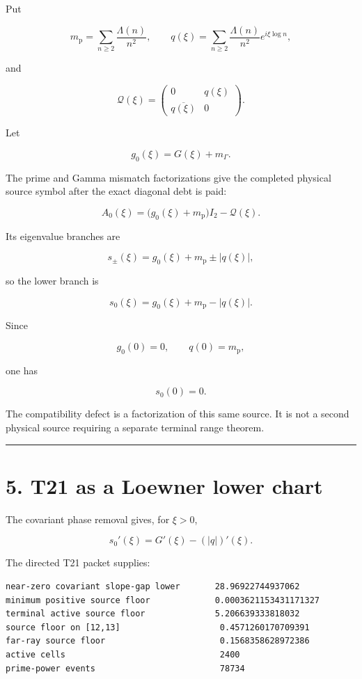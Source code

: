 Put

\[
m_{\mathrm p}
=
\sum_{n\ge2}\frac{\Lambda(n)}{n^2},
\qquad
q(\xi)
=
\sum_{n\ge2}
\frac{\Lambda(n)}{n^2}e^{i\xi\log n},
\]

and

\[
\mathcal Q(\xi)
=
\begin{pmatrix}
0&q(\xi)\\
\overline{q(\xi)}&0
\end{pmatrix}.
\]

Let

\[
g_0(\xi)=G(\xi)+m_\Gamma.
\]

The prime and Gamma mismatch factorizations give the completed physical source
symbol after the exact diagonal debt is paid:

\[
\boxed{
A_0(\xi)
=
\bigl(g_0(\xi)+m_{\mathrm p}\bigr)I_2
-
\mathcal Q(\xi).
}
\tag{4.1}
\]

Its eigenvalue branches are

\[
s_\pm(\xi)
=
g_0(\xi)+m_{\mathrm p}\pm|q(\xi)|,
\]

so the lower branch is

\[
\boxed{
s_0(\xi)
=
g_0(\xi)+m_{\mathrm p}-|q(\xi)|.
}
\tag{4.2}
\]

Since

\[
g_0(0)=0,
\qquad
q(0)=m_{\mathrm p},
\]

one has

\[
s_0(0)=0.
\]

The compatibility defect is a factorization of this same source. It is not a
second physical source requiring a separate terminal range theorem.

\begin{center}\rule{0.5\linewidth}{0.5pt}\end{center}

\hypertarget{t21-as-a-loewner-lower-chart}{%
\section{5. T21 as a Loewner lower chart}\label{t21-as-a-loewner-lower-chart}}

The covariant phase removal gives, for \(\xi>0\),

\[
s_0'(\xi)
=
G'(\xi)-(|q|)'(\xi).
\]

The directed T21 packet supplies:

\begin{verbatim}
near-zero covariant slope-gap lower       28.96922744937062
minimum positive source floor             0.0003621153431171327
terminal active source floor              5.206639333818032
source floor on [12,13]                    0.4571260170709391
far-ray source floor                       0.1568358628972386
active cells                               2400
prime-power events                         78734
\end{verbatim}


